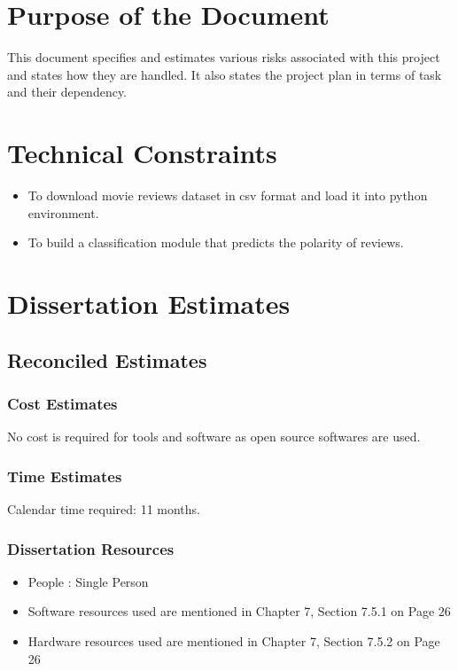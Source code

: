 \documentclass[oneside,a4paper,12pt]{pictreport}
\begin{document}
\section{Purpose of the Document}
This document specifies and estimates various risks associated with this project and states how they are handled. It also states the project plan in terms of task and their dependency.

\section{Technical Constraints}
\begin{itemize}

\item To download movie reviews dataset in csv format and load it into python environment.
\item To build a classification module that predicts the polarity of reviews.
\end{itemize}

\section{Dissertation Estimates}
\subsection{Reconciled Estimates}
\subsubsection{Cost Estimates}
No cost is required for tools and software as open source softwares are used.
\subsubsection{Time Estimates}
Calendar time required: 11 months.
\subsubsection{Dissertation Resources}
\begin{itemize}
\item People : Single Person
\item Software resources used are mentioned in Chapter 7, Section 7.5.1 on Page 26
\item Hardware resources used are mentioned in Chapter 7, Section 7.5.2 on Page 26

\end{itemize}
\end{document}
